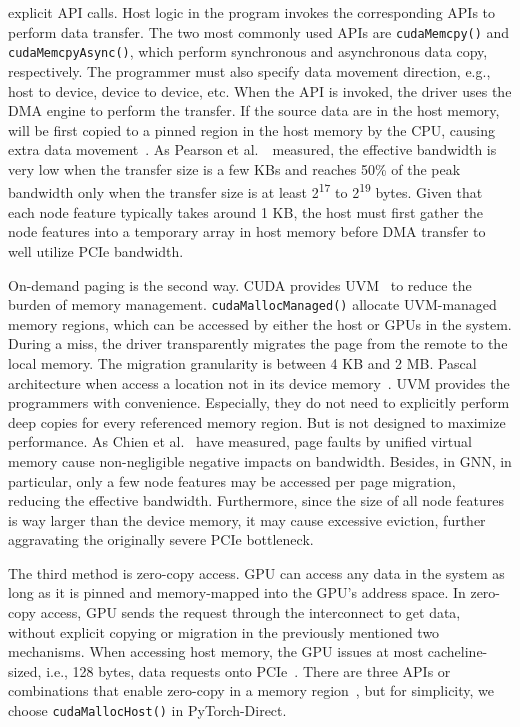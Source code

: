  explicit API calls.
Host logic in the program invokes the corresponding APIs to perform data transfer.
The two most commonly used APIs are \texttt{cudaMemcpy()} and \texttt{cudaMemcpyAsync()}, which perform synchronous and asynchronous data copy, respectively.
The programmer must also specify data movement direction, e.g., host to device, device to device, etc.
When the API is invoked, the driver uses the DMA engine to perform the transfer.
If the source data are in the host memory,  will be first copied to a pinned region in the host memory by the CPU, causing extra data movement~\cite{pearson19, gpudirectrdma}.
As Pearson et al.~\cite{pearson19}\ measured, the effective bandwidth is very low when the transfer size is a few KBs and reaches 50\% of the peak bandwidth only when the transfer size is at least 2\textsuperscript{17} to 2\textsuperscript{19} bytes.
Given that each node feature typically takes around 1 KB, the host must first gather the node features into a temporary array in host memory before DMA transfer to well utilize PCIe bandwidth.

On-demand paging is the second way. CUDA provides UVM~\cite{UVMPrimer} to reduce the burden of memory management.
\texttt{cudaMallocManaged()}  allocate UVM-managed memory regions, which can be accessed by either the host or GPUs in the system.
During a miss, the driver transparently migrates the page from the remote to the local memory.
The migration granularity is between 4 KB and 2 MB.
 Pascal architecture when access a location not in its device memory~\cite{UVMPrimer2, P100Whitepaper}.
UVM provides the programmers with convenience.
Especially, they do not need to explicitly perform deep copies for every referenced memory region.
But  is not designed to maximize performance.
As Chien et al.~\cite{Chien_2019} have measured, page faults by unified virtual memory cause non-negligible negative impacts on bandwidth.
Besides, in GNN, in particular, only a few node features may be accessed per page migration, reducing the effective bandwidth.
Furthermore, since the  size of all node features is way larger than the device memory, it may cause excessive eviction, further aggravating the originally severe PCIe bottleneck.

The third method is zero-copy access.
GPU can access any data in the system as long as it is pinned and memory-mapped into the GPU's address space.
In zero-copy access, GPU sends the request through the interconnect to get data, without explicit copying or migration in the previously mentioned two mechanisms.
When accessing host memory, the GPU issues at most cacheline-sized, i.e., 128 bytes, data requests onto PCIe~\cite{minEMOGIEfficientMemoryaccess2020}.
There are three APIs or combinations that enable zero-copy in a memory region~\cite{min2021pytorchdirect}, but for simplicity, we choose \texttt{cudaMallocHost()} in PyTorch-Direct.


